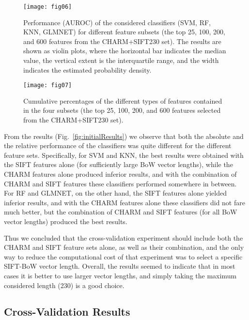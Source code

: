 \begin{figure*}[!t]
\centering
\texttt{[image: fig06]}
\caption{\color{red}Performance (AUROC) of the considered classifiers (SVM, RF, KNN, GLMNET) for different feature subsets (the top 25, 100, 200, and 600 features from the CHARM+SIFT230 set). The results are shown as violin plots, where the horizontal bar indicates the median value, the vertical extent is the interquartile range, and the width indicates the estimated probability density.}
\label{fig:subsetResults}
\end{figure*}

\begin{figure}[!t]
\centering
\texttt{[image: fig07]}
\caption{\color{red}Cumulative percentages of the different types of features contained in the four subsets (the top 25, 100, 200, and 600 features selected from the CHARM+SIFT230 set).}
\label{fig:subsetFS}
\end{figure}

From the results (Fig.~\ref{fig:initialResults}) we observe that both the absolute and the relative performance of the classifiers was quite different for the different feature sets. Specifically, for SVM and KNN, the best results were obtained with the SIFT features alone (for sufficiently large BoW vector lengths), while the CHARM features alone produced inferior results, and with the combination of CHARM and SIFT features these classifiers performed somewhere in between. For RF and GLMNET, on the other hand, the SIFT features alone yielded inferior results, and with the CHARM features alone these classifiers did not fare much better, but the combination of CHARM and SIFT features (for all BoW vector lengths) produced the best results.

Thus we concluded that the cross-validation experiment should include both the CHARM and SIFT feature sets alone, as well as their combination, and the only way to reduce the computational cost of that experiment was to select a specific SIFT-BoW vector length. Overall, the results seemed to indicate that in most cases it is better to use larger vector lengths, and simply taking the maximum considered length (230) is a good choice.

\subsection{Cross-Validation Results}
\label{subsec:baselineResults}


